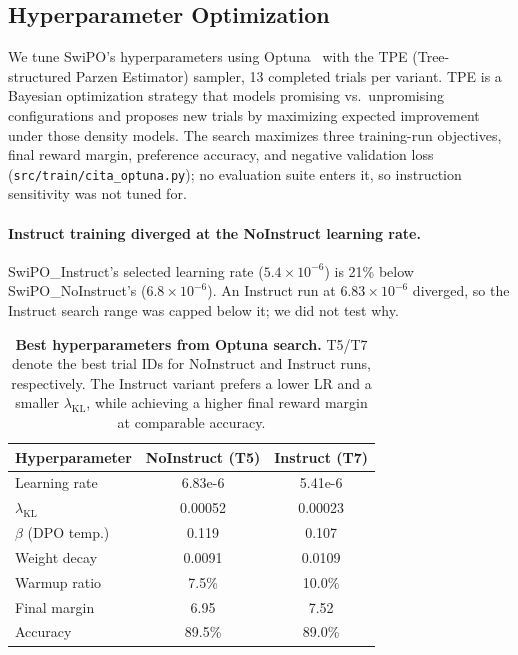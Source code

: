 \vspace{-1mm}
\subsection{Hyperparameter Optimization}
\label{sec:hyperparams_appendix}

We tune SwiPO's hyperparameters using Optuna~\cite{akiba2019optuna} with the TPE (Tree-structured Parzen Estimator) sampler, 13 completed trials per variant.
TPE is a Bayesian optimization strategy that models promising vs.\ unpromising configurations and proposes new trials by maximizing expected improvement under those density models.
The search maximizes three training-run objectives, final reward margin, preference accuracy, and negative validation loss (\texttt{src/train/cita\_optuna.py}); no evaluation suite enters it, so instruction sensitivity was not tuned for.

\vspace{-0.2em}
\paragraph{\textbf{Instruct training diverged at the NoInstruct learning rate.}}
SwiPO\_Instruct's selected learning rate ($5.4\times10^{-6}$) is 21\% below SwiPO\_NoInstruct's ($6.8\times10^{-6}$). An Instruct run at $6.83\times10^{-6}$ diverged, so the Instruct search range was capped below it; we did not test why.

\begin{table}[ht!]
\centering
\normalsize
\setlength{\tabcolsep}{6pt}
\renewcommand{\arraystretch}{1.2}
\begin{tabular}{@{}lcc@{}}
\toprule
\textbf{Hyperparameter} & \textbf{NoInstruct (T5)} & \textbf{Instruct (T7)} \\
\midrule
Learning rate & 6.83e-6 & 5.41e-6 \\ \hline
$\lambda_{\text{KL}}$ & 0.00052 & 0.00023 \\ \hline
$\beta$ (DPO temp.) & 0.119 & 0.107 \\ \hline
Weight decay & 0.0091 & 0.0109 \\ \hline
Warmup ratio & 7.5\% & 10.0\% \\
\midrule
Final margin & 6.95 & 7.52 \\ \hline
Accuracy & 89.5\% & 89.0\% \\
\bottomrule
\end{tabular}
\caption{\textbf{Best hyperparameters from Optuna search.} T5/T7 denote the best trial IDs for NoInstruct and Instruct runs, respectively. The Instruct variant prefers a lower LR and a smaller $\lambda_{\text{KL}}$, while achieving a higher final reward margin at comparable accuracy.}
\label{tab:hyperparams_exp}
\vspace{-4mm}
\end{table}

